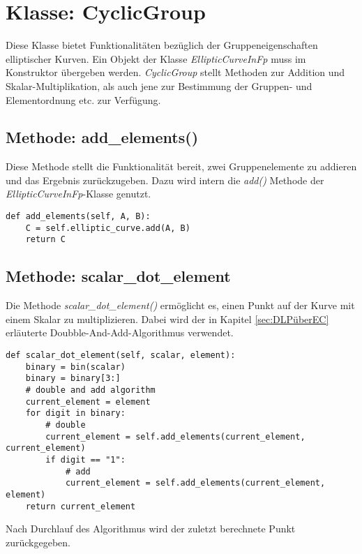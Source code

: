 \section{Klasse: CyclicGroup}
Diese Klasse bietet Funktionalitäten bezüglich der Gruppeneigenschaften elliptischer Kurven. Ein Objekt der Klasse \textit{EllipticCurveInFp} muss im Konstruktor übergeben werden. \textit{CyclicGroup} stellt Methoden zur Addition und Skalar-Multiplikation, als auch jene zur Bestimmung der Gruppen- und Elementordnung etc. zur Verfügung.
\subsection{Methode: add\_elements()}
Diese Methode stellt die Funktionalität bereit, zwei Gruppenelemente zu addieren und das Ergebnis zurückzugeben. Dazu wird intern die \textit{add()} Methode der \textit{EllipticCurveInFp}-Klasse genutzt.
\vspace{\baselineskip}
\begin{lstlisting}[caption={Methode: add\_elements()}, captionpos=b]
def add_elements(self, A, B):
	C = self.elliptic_curve.add(A, B)
    return C
\end{lstlisting}
\vspace{\baselineskip}

\subsection{Methode: scalar\_dot\_element}
Die Methode \textit{scalar\_dot\_element()} ermöglicht es, einen Punkt auf der Kurve mit einem Skalar zu multiplizieren. Dabei wird der in Kapitel \ref{sec:DLPüberEC} erläuterte Doubble-And-Add-Algorithmus verwendet.

\vspace{\baselineskip}
\begin{lstlisting}[caption={Methode: scalar\_dot\_element()}, captionpos=b]
def scalar_dot_element(self, scalar, element):
    binary = bin(scalar)
    binary = binary[3:]
    # double and add algorithm
    current_element = element
    for digit in binary:
        # double
        current_element = self.add_elements(current_element, current_element)
        if digit == "1":
            # add
            current_element = self.add_elements(current_element, element)
    return current_element
\end{lstlisting}
\vspace{\baselineskip}
Nach Durchlauf des Algorithmus wird der zuletzt berechnete Punkt zurückgegeben.

